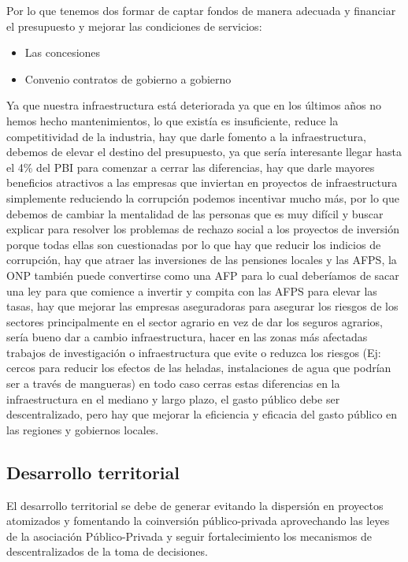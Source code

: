\documentclass[
  jou,
  floatsintext,
  longtable,
  a4paper,
  nolmodern,
  notxfonts,
  notimes,
  12pt,
  colorlinks=true,linkcolor=blue,citecolor=blue,urlcolor=blue]{apa7}
\providecommand{\tightlist}{%
  \setlength{\itemsep}{0pt}\setlength{\parskip}{0pt}}
\begin{document}
Por lo que tenemos dos formar de captar fondos de manera adecuada y
financiar el presupuesto y mejorar las condiciones de servicios:

\begin{itemize}
\tightlist
\item
  Las concesiones
\item
  Convenio contratos de gobierno a gobierno
\end{itemize}

Ya que nuestra infraestructura está deteriorada ya que en los últimos
años no hemos hecho mantenimientos, lo que existía es insuficiente,
reduce la competitividad de la industria, hay que darle fomento a la
infraestructura, debemos de elevar el destino del presupuesto, ya que
sería interesante llegar hasta el 4\% del PBI para comenzar a cerrar las
diferencias, hay que darle mayores beneficios atractivos a las empresas
que inviertan en proyectos de infraestructura simplemente reduciendo la
corrupción podemos incentivar mucho más, por lo que debemos de cambiar
la mentalidad de las personas que es muy difícil y buscar explicar para
resolver los problemas de rechazo social a los proyectos de inversión
porque todas ellas son cuestionadas por lo que hay que reducir los
indicios de corrupción, hay que atraer las inversiones de las pensiones
locales y las AFPS, la ONP también puede convertirse como una AFP para
lo cual deberíamos de sacar una ley para que comience a invertir y
compita con las AFPS para elevar las tasas, hay que mejorar las empresas
aseguradoras para asegurar los riesgos de los sectores principalmente en
el sector agrario en vez de dar los seguros agrarios, sería bueno dar a
cambio infraestructura, hacer en las zonas más afectadas trabajos de
investigación o infraestructura que evite o reduzca los riesgos (Ej:
cercos para reducir los efectos de las heladas, instalaciones de agua
que podrían ser a través de mangueras) en todo caso cerras estas
diferencias en la infraestructura en el mediano y largo plazo, el gasto
público debe ser descentralizado, pero hay que mejorar la eficiencia y
eficacia del gasto público en las regiones y gobiernos locales.

\subsection{Desarrollo territorial}\label{desarrollo-territorial}

El desarrollo territorial se debe de generar evitando la dispersión en
proyectos atomizados y fomentando la coinversión público-privada
aprovechando las leyes de la asociación Público-Privada y seguir
fortalecimiento los mecanismos de descentralizados de la toma de
decisiones.
\end{document}
